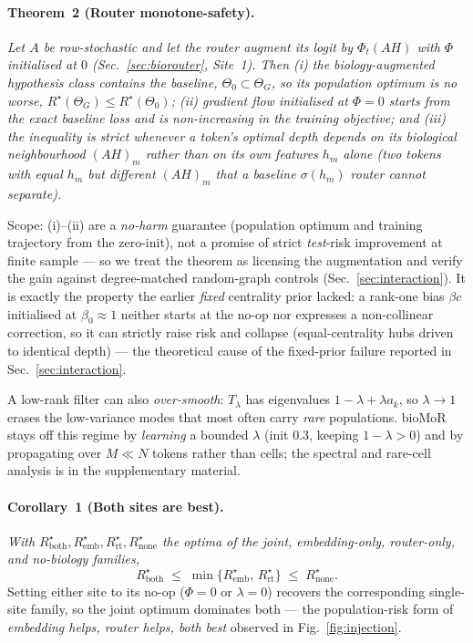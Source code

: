 \documentclass[letterpaper]{article}
\begin{document}
\paragraph{Theorem~2 (Router monotone-safety).}
\emph{Let $A$ be row-stochastic and let the router augment its logit by $\Phi_t(AH)$ with $\Phi$
initialised at $0$ (Sec.~\ref{sec:biorouter}, Site~1). Then (i) the biology-augmented hypothesis
class contains the baseline, $\Theta_0\subset\Theta_G$, so its population optimum is no worse,
$R^\star(\Theta_G)\le R^\star(\Theta_0)$; (ii) gradient flow initialised at $\Phi{=}0$ starts from
the exact baseline loss and is non-increasing in the training objective; and (iii) the inequality
is strict whenever a token's optimal depth depends on its biological neighbourhood $(AH)_m$ rather
than on its own features $h_m$ alone (two tokens with equal $h_m$ but different $(AH)_m$ that a
baseline $\sigma(h_m)$ router cannot separate).}

Scope: (i)--(ii) are a \emph{no-harm} guarantee (population optimum and training trajectory from the
zero-init), not a promise of strict \emph{test}-risk improvement at finite sample --- so we treat the
theorem as licensing the augmentation and verify the gain against degree-matched random-graph controls
(Sec.~\ref{sec:interaction}). It is exactly the property the earlier \emph{fixed} centrality prior
lacked: a rank-one bias $\beta c$ initialised at $\beta_0\!\approx\!1$ neither starts at the no-op nor
expresses a non-collinear correction, so it can strictly raise risk and collapse (equal-centrality
hubs driven to identical depth) --- the theoretical cause of the fixed-prior failure reported
in Sec.~\ref{sec:interaction}.

A low-rank filter can also \emph{over-smooth}: $T_\lambda$ has eigenvalues $1-\lambda+\lambda a_k$, so
$\lambda\to1$ erases the low-variance modes that most often carry \emph{rare} populations. bioMoR
stays off this regime by \emph{learning} a bounded $\lambda$ (init $0.3$, keeping $1-\lambda>0$) and
by propagating over $M{\ll}N$ tokens rather than cells; the spectral and rare-cell analysis is in the
supplementary material.

\paragraph{Corollary~1 (Both sites are best).}
\emph{With $R^\star_{\mathrm{both}},R^\star_{\mathrm{emb}},R^\star_{\mathrm{rt}},R^\star_{\mathrm{none}}$
the optima of the joint, embedding-only, router-only, and no-biology families,}
\begin{equation*}
R^\star_{\mathrm{both}}\;\le\;\min\{R^\star_{\mathrm{emb}},\,R^\star_{\mathrm{rt}}\}\;\le\;R^\star_{\mathrm{none}}.
\end{equation*}
Setting either site to its no-op ($\Phi{=}0$ or $\lambda{=}0$) recovers the corresponding
single-site family, so the joint optimum dominates both --- the population-risk form of
\emph{embedding helps, router helps, both best} observed in Fig.~\ref{fig:injection}.
\end{document}
